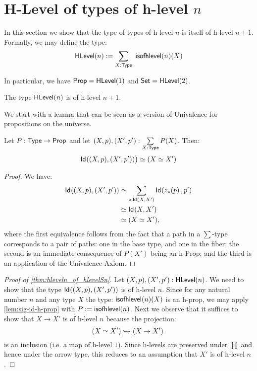 \section{H-Level of types of h-level $n$}

In this section we show that the type of types of h-level $n$ is itself of h-level $n+1$. Formally, we may define the type:
 \[\HLevel(n) := \sum_{X : \type} \ \isofhlevel(n)(X) \]

In particular, we have $\mathsf{Prop} = \mathsf{HLevel}(1)$ and $\mathsf{Set} = \mathsf{HLevel}(2)$.

\begin{thm}\label{thm:hleveln_of_hlevelSn}
 The type $\mathsf{HLevel}(n)$ is of h-level $n+1$.
\end{thm}

We start with a lemma that can be seen as a version of Univalence for propositions on the universe.

\begin{lem}\label{lem:sig-id-h-prop}
 Let $P : \mathsf{Type} \to \mathsf{Prop}$ and let $(X, p), (X', p') : \sum\limits_{X : \mathsf{Type}} P(X)$. Then:
 \[ \mathsf{Id}_{}((X, p),(X', p')) \big) \simeq (X \simeq X')\]
\end{lem}

\begin{proof}
 We have:
 \begin{equation*}\begin{split}
 \mathsf{Id}_{}((X, p),(X', p')) & \simeq \sum_{z : \mathsf{Id}_{}(X,X')} \mathsf{Id}_{}({z}_{*}\!\left({p}\right),p') \\
  & \simeq \mathsf{Id}_{}(X,X') \\
  & \simeq (X \simeq X'),
 \end{split}
 \end{equation*}
 where the first equivalence follows from the fact that a path in a $\sum$-type corresponds to a pair of paths: one in the base type, and one in the fiber; the second is an immediate consequence of $P(X')$ being an h-Prop; and the third is an application of the Univalence Axiom.
\end{proof}

\begin{proof}[Proof of \autoref{thm:hleveln_of_hlevelSn}]
 Let $(X, p), (X', p') : \mathsf{HLevel}(n)$. We need to show that the type $\mathsf{Id}_{}((X, p),(X', p'))$ is of h-level $n$. Since for any natural number $n$ and any type $X$ the type: $\mathsf{isofhlevel}(n)(X)$ is an h-prop, we may apply \autoref{lem:sig-id-h-prop} with $P := \mathsf{isofhlevel}(n)$. Next we observe that it suffices to show that $X \rightarrow X'$ is of h-level $n$ because the projection:
 \[(X \simeq X') \hookrightarrow (X \rightarrow X').\]
 is an inclusion (i.e. a map of h-level $1$). Since h-levels are preserved under $\prod$ and hence under the arrow type, this reduces to an assumption that $X'$ is of h-level $n$.
\end{proof}
